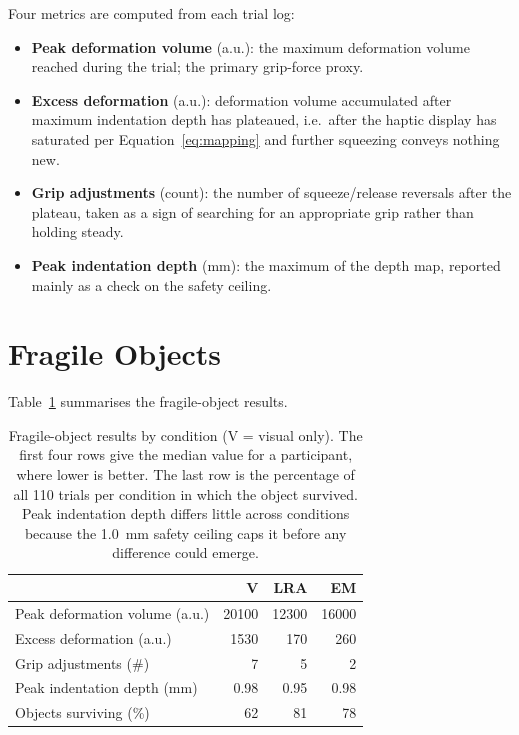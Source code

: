 \documentclass[12pt, a4paper, twoside, openright]{report}
\begin{document}
Four metrics are computed from each trial log:

\begin{itemize}
    \item \textbf{Peak deformation volume} (a.u.): the maximum deformation
          volume reached during the trial; the primary grip-force proxy.
    \item \textbf{Excess deformation} (a.u.): deformation volume accumulated
          after maximum indentation depth has plateaued, i.e.\ after the haptic
          display has saturated per Equation~\eqref{eq:mapping} and further
          squeezing conveys nothing new.
    \item \textbf{Grip adjustments} (count): the number of squeeze/release
          reversals after the plateau, taken as a sign of searching for an
          appropriate grip rather than holding steady.
    \item \textbf{Peak indentation depth} (\si{\milli\metre}): the maximum of
          the depth map, reported mainly as a check on the safety ceiling.
\end{itemize}

\section{Fragile Objects}
\label{sec:results-fragile}

Table~\ref{tab:quant} summarises the fragile-object results.

\begin{table}[htbp]
    \centering
    \caption{Fragile-object results by condition (V = visual only). The first
        four rows give the median value for a participant, where lower is better.
        The last row is the percentage of all 110 trials per condition in which the
        object survived. Peak indentation depth differs little across conditions
        because the \SI{1.0}{\milli\metre} safety ceiling caps it before any
        difference could emerge.}
    \label{tab:quant}
    \begin{tabular}{@{}lrrr@{}}
        \toprule
                                       & V     & LRA   & EM    \\
        \midrule
        Peak deformation volume (a.u.) & 20100 & 12300 & 16000 \\
        Excess deformation (a.u.)      & 1530  & 170   & 260   \\
        Grip adjustments (\#)          & 7     & 5     & 2     \\
        Peak indentation depth (mm)    & 0.98  & 0.95  & 0.98  \\
        \midrule
        Objects surviving (\%)         & 62    & 81    & 78    \\
        \bottomrule
    \end{tabular}
\end{table}
\end{document}
